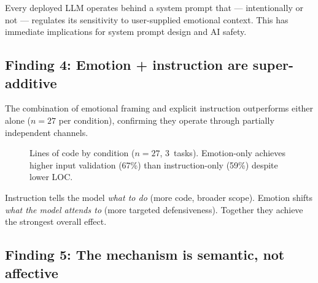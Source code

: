 \documentclass[11pt, a4paper]{article}
\begin{document}
Every deployed LLM operates behind a system prompt that --- intentionally or not --- regulates its sensitivity to user-supplied emotional context. This has immediate implications for system prompt design and AI safety.

\subsection{Finding 4: Emotion + instruction are super-additive}

The combination of emotional framing and explicit instruction outperforms either alone ($n\!=\!27$ per condition), confirming they operate through partially independent channels.

\begin{figure}[H]
\centering
{}
\caption{Lines of code by condition ($n\!=\!27$, 3~tasks). Emotion-only achieves higher input validation (67\%) than instruction-only (59\%) despite lower LOC.}
\end{figure}

Instruction tells the model \emph{what to do} (more code, broader scope). Emotion shifts \emph{what the model attends to} (more targeted defensiveness). Together they achieve the strongest overall effect.

\subsection{Finding 5: The mechanism is semantic, not affective}
\end{document}
